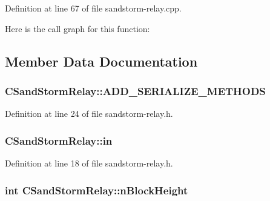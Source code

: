 Definition at line 67 of file sandstorm-\/relay.\+cpp.



Here is the call graph for this function\+:




\subsection{Member Data Documentation}
\hypertarget{class_c_sand_storm_relay_a92f4ec8c13a51b958a620729460c205f}{}
\subsubsection[{A\+D\+D\+\_\+\+S\+E\+R\+I\+A\+L\+I\+Z\+E\+\_\+\+M\+E\+T\+H\+O\+D\+S}]{\setlength{\rightskip}{0pt plus 5cm}C\+Sand\+Storm\+Relay\+::\+A\+D\+D\+\_\+\+S\+E\+R\+I\+A\+L\+I\+Z\+E\+\_\+\+M\+E\+T\+H\+O\+D\+S}\label{class_c_sand_storm_relay_a92f4ec8c13a51b958a620729460c205f}


Definition at line 24 of file sandstorm-\/relay.\+h.

\hypertarget{class_c_sand_storm_relay_af8dcec2c973e41cf6f42cfe4443e3925}{}
\subsubsection[{in}]{ C\+Sand\+Storm\+Relay\+::in}\label{class_c_sand_storm_relay_af8dcec2c973e41cf6f42cfe4443e3925}


Definition at line 18 of file sandstorm-\/relay.\+h.

\hypertarget{class_c_sand_storm_relay_a38fd3f66b75775160f98c85b1c3b81d0}{}
\subsubsection[{n\+Block\+Height}]{\setlength{\rightskip}{0pt plus 5cm}int C\+Sand\+Storm\+Relay\+::n\+Block\+Height}\label{class_c_sand_storm_relay_a38fd3f66b75775160f98c85b1c3b81d0}



